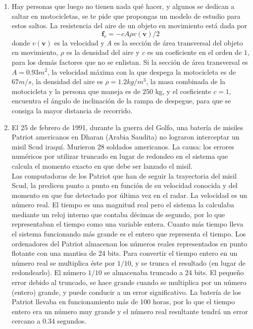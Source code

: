\documentclass[12pt]{article}
\begin{document}
\begin{enumerate}
\begin{enumerate}
\end{enumerate}
\item Hay personas que luego no tienen nada qu\'{e} hacer, y algunos se dedican a saltar en motocicletas, se te pide que propongas un modelo de estudio para estos saltos. La resistencia del aire de un objeto en movimiento est\'{a} dada por 
\[ \textbf{f}_{r} = - cA \rho v(\textbf{v})/2 \]
donde $v(\textbf{v})$ es la velocidad y \textit{A} es la secci\'{o}n de \'{a}rea transversal del objeto en movimiento, $\rho$ es la densidad del aire y \textit{c} es un coeficiente en el orden de $1$, para los dem\'{a}s factores que no se enlistan. Si la secci\'{o}n de \'{a}rea transversal es $A=0.93m^{2}$, la velocidad m\'{a}xima con la que despega la motocicleta es de $67 m/s$, la densidad del aire es
 $\rho = 1.2 kg/m^{3}$, la masa combinada de la motocicleta y la persona que maneja es de $250$ kg, y el coeficiente $c=1$, encuentra el \'{a}ngulo de inclinaci\'{o}n de la rampa de despegue, para que se consiga la mayor distancia de recorrido.
\item El 25 de febrero de 1991, durante la guerra del Golfo, una bater\'{i}a de misiles Patriot americanos en Dharan (Arabia Saudita) no lograron interceptar un misil Scud iraqu\'{i}. Murieron 28 soldados americanos. La causa: los errores num\'{e}ricos por utilizar truncado en lugar de redondeo en el sistema que calcula el momento exacto en que debe ser lanzado el misil.\\
Las computadoras de los Patriot que han de seguir la trayectoria del misil Scud, la predicen punto a punto en funci\'{o}n de su velocidad conocida y del momento en que fue detectado por última vez en el radar. La velocidad es un número real. El tiempo es una magnitud real pero el sistema la calculaba mediante un reloj interno que contaba d\'{e}cimas de segundo, por lo que representaban el tiempo como una variable entera. Cuanto m\'{a}s tiempo lleva el sistema funcionando m\'{a}s grande es el entero que representa el tiempo. Los ordenadores del Patriot almacenan los números reales representados en punto flotante con una mantisa de 24 bits. Para convertir el tiempo entero en un número real se multiplica \'{e}ste por $1/10$, y se trunca el resultado (en lugar de redondearlo). El número $1/10$ se almacenaba truncado a 24 bits. El pequeño error debido al truncado, se hace grande cuando se multiplica por un número (entero) grande, y puede conducir a un error significativo. La bater\'{i}a de los Patriot llevaba en funcionamiento m\'{a}s de 100 horas, por lo que el tiempo entero era un número muy grande y el número real resultante tendr\'{a} un error cercano a $0.34$ segundos.

\end{enumerate}
\end{document}
